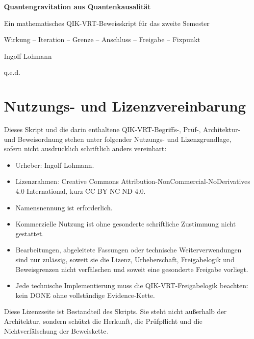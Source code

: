 \documentclass[11pt,a4paper,oneside]{scrartcl}
\theoremstyle{qikstyle}
\begin{document}
\begin{titlepage}
\centering
\vspace*{20mm}
{\Huge\sffamily\bfseries Quantengravitation aus Quantenkausalität\par}
\vspace{7mm}
{\Large\sffamily Ein mathematisches QIK-VRT-Beweisskript für das zweite Semester\par}
\vspace{12mm}
{\large Wirkung -- Iteration -- Grenze -- Anschluss -- Freigabe -- Fixpunkt\par}
\vfill
{\Large Ingolf Lohmann\par}
\vspace{4mm}
{\large q.e.d.\par}
\vspace*{18mm}
\end{titlepage}

\section*{Nutzungs- und Lizenzvereinbarung}
Dieses Skript und die darin enthaltene QIK-VRT-Begriffs-, Prüf-, Architektur- und Beweisordnung stehen unter folgender Nutzungs- und Lizenzgrundlage, sofern nicht ausdrücklich schriftlich anders vereinbart:

\begin{itemize}
\item Urheber: Ingolf Lohmann.
\item Lizenzrahmen: Creative Commons Attribution-NonCommercial-NoDerivatives 4.0 International, kurz CC BY-NC-ND 4.0.
\item Namensnennung ist erforderlich.
\item Kommerzielle Nutzung ist ohne gesonderte schriftliche Zustimmung nicht gestattet.
\item Bearbeitungen, abgeleitete Fassungen oder technische Weiterverwendungen sind nur zulässig, soweit sie die Lizenz, Urheberschaft, Freigabelogik und Beweisgrenzen nicht verfälschen und soweit eine gesonderte Freigabe vorliegt.
\item Jede technische Implementierung muss die QIK-VRT-Freigabelogik beachten: kein DONE ohne vollständige Evidence-Kette.
\end{itemize}

Diese Lizenzseite ist Bestandteil des Skripts. Sie steht nicht außerhalb der Architektur, sondern schützt die Herkunft, die Prüfpflicht und die Nichtverfälschung der Beweiskette.
\end{document}
